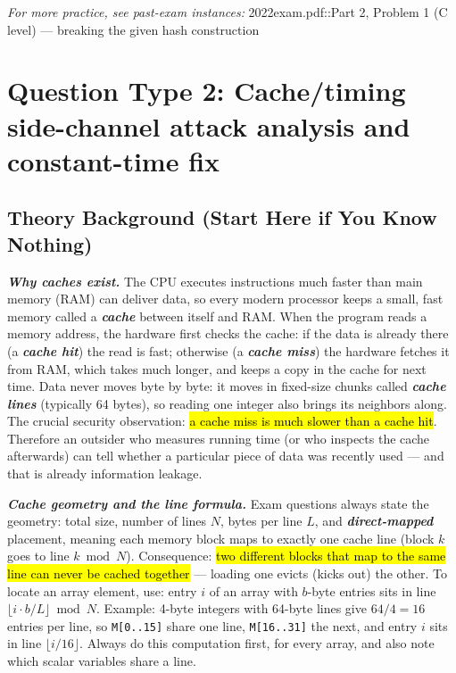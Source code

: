 \documentclass[12pt, a4paper]{article}
\newcommand{\term}[1]{\textbf{\textit{#1}}}        %
\newcommand{\imp}[1]{\hl{#1}}                       %
\begin{document}
\textit{For more practice, see past-exam instances:} 2022exam.pdf::Part 2, Problem 1 (C level) — breaking the given hash construction

\section{Question Type 2: Cache/timing side-channel attack analysis and constant-time fix}

\subsection*{Theory Background (Start Here if You Know Nothing)}
\term{Why caches exist.} The CPU executes instructions much faster than main memory (RAM) can deliver data, so every modern processor keeps a small, fast memory called a \term{cache} between itself and RAM. When the program reads a memory address, the hardware first checks the cache: if the data is already there (a \term{cache hit}) the read is fast; otherwise (a \term{cache miss}) the hardware fetches it from RAM, which takes much longer, and keeps a copy in the cache for next time. Data never moves byte by byte: it moves in fixed-size chunks called \term{cache lines} (typically 64 bytes), so reading one integer also brings its neighbors along. The crucial security observation: \imp{a cache miss is much slower than a cache hit}. Therefore an outsider who measures running time (or who inspects the cache afterwards) can tell whether a particular piece of data was recently used --- and that is already information leakage.

\term{Cache geometry and the line formula.} Exam questions always state the geometry: total size, number of lines $N$, bytes per line $L$, and \term{direct-mapped} placement, meaning each memory block maps to exactly one cache line (block $k$ goes to line $k \bmod N$). Consequence: \imp{two different blocks that map to the same line can never be cached together} --- loading one evicts (kicks out) the other. To locate an array element, use: entry $i$ of an array with $b$-byte entries sits in line $\lfloor i \cdot b / L \rfloor \bmod N$. Example: 4-byte integers with 64-byte lines give $64/4 = 16$ entries per line, so \texttt{M[0..15]} share one line, \texttt{M[16..31]} the next, and entry $i$ sits in line $\lfloor i/16 \rfloor$. Always do this computation first, for every array, and also note which scalar variables share a line.
\end{document}
